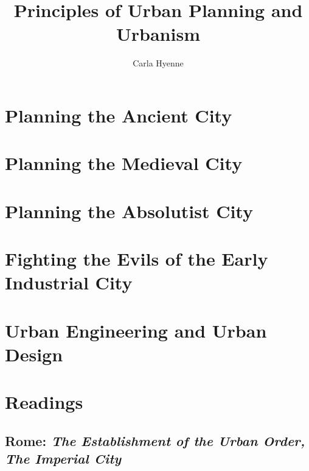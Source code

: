 \documentclass{article}
\title{Principles of Urban Planning and Urbanism}
\author{Carla Hyenne}
\begin{document}
\maketitle

\tableofcontents

\pagebreak

\section{Planning the Ancient City}

\section{Planning the Medieval City}

\section{Planning the Absolutist City}

\section{Fighting the Evils of the Early Industrial City}

\section{Urban Engineering and Urban Design}

\section{Readings}

\subsection{Rome: \textit{The Establishment of the Urban Order, The Imperial City} \parencite{hall1998cities}}
\end{document}
